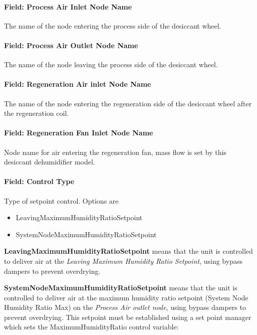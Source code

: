 \paragraph{Field: Process Air Inlet Node Name}\label{field-process-air-inlet-node-name}

The name of the node entering the process side of the desiccant wheel.

\paragraph{Field: Process Air Outlet Node Name}\label{field-process-air-outlet-node-name}

The name of the node leaving the process side of the desiccant wheel.

\paragraph{Field: Regeneration Air inlet Node Name}\label{field-regeneration-air-inlet-node-name}

The name of the node entering the regeneration side of the desiccant wheel after the regeneration coil.

\paragraph{Field: Regeneration Fan Inlet Node Name}\label{field-regeneration-fan-inlet-node-name}

Node name for air entering the regeneration fan, mass flow is set by this desiccant dehumidifier model.

\paragraph{Field: Control Type}\label{field-control-type-000}

Type of setpoint control. Options are

\begin{itemize}
\item
  LeavingMaximumHumidityRatioSetpoint
\item
  SystemNodeMaximumHumidityRatioSetpoint
\end{itemize}

\textbf{LeavingMaximumHumidityRatioSetpoint} means that the unit is controlled to deliver air at the \emph{Leaving Maximum Humidity Ratio Setpoint}, using bypass dampers to prevent overdrying.

\textbf{SystemNodeMaximumHumidityRatioSetpoint} means that the unit is controlled to deliver air at the maximum humidity ratio setpoint (System Node Humidity Ratio Max) on the \emph{Process Air outlet node}, using bypass dampers to prevent overdrying. This setpoint must be established using a set point manager which sets the MaximumHumidityRatio control variable:

